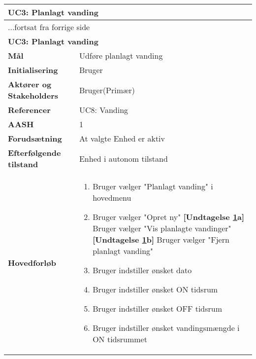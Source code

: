 \begin{center} \centering \label{UC3} 
	\begin{longtable}{|p{5cm}|p{9cm}|}  %
	\hline
		\multicolumn{2}{|l|}{\textbf{UC3: Planlagt vanding}} \\\hline %
		\endfirsthead
		
		\multicolumn{2}{l}{...fortsat fra forrige side} \\ \hline %
		\multicolumn{2}{|l|}{\textbf{UC3: Planlagt vanding}} \\\hline %
		\endhead	
		
		\textbf{Mål}								&Udføre planlagt vanding			\\\hline
		\textbf{Initialisering}					&Bruger			\\\hline
		\textbf{Aktører og Stakeholders}			&Bruger(Primær)			\\\hline
		\textbf{Referencer}						&UC8: Vanding					\\\hline
		\textbf{AASH}							&1 						\\\hline
		\textbf{Forudsætning}					&At valgte Enhed er aktiv			\\\hline
		\textbf{Efterfølgende tilstand}			&Enhed i autonom tilstand			\\\hline
		\textbf{Hovedforløb}					
			&\begin{enumerate}
	
				\item \label{uc3valg}Bruger vælger "Planlagt vanding" i hovedmenu 
				
				\item Bruger vælger "Opret ny"\newline
					  \textbf{[Undtagelse \ref{uc3valg}a]} 	\newline
					  Bruger vælger "Vis planlagte vandinger"\newline
					  \textbf{[Undtagelse \ref{uc3valg}b]} 	\newline
					  Bruger vælger "Fjern planlagt vanding"
				
				\item Bruger indstiller ønsket dato
				
				\item Bruger indstiller ønsket ON tidsrum
				
				\item Bruger indstiller ønsket OFF tidsrum
				
				\item Bruger indstiller ønsket vandingsmængde i ON tidsrummet
				

\end{enumerate}
\end{longtable}
\end{center}
